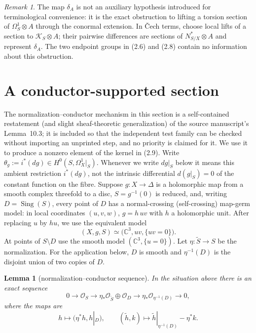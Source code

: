 \documentclass[11pt]{amsart}
\newcommand{\C}{\mathbb C}
\newcommand{\cO}{\mathcal O}
\newcommand{\Sing}{\operatorname{Sing}}
\theoremstyle{plain}
\newtheorem{lemma}[theorem]{Lemma}
\theoremstyle{definition}
\theoremstyle{remark}
\newtheorem{remark}[theorem]{Remark}
\begin{document}
\begin{remark}
The map $\delta_A$ is not an auxiliary hypothesis introduced for
terminological convenience: it is the exact obstruction to lifting a torsion
section of $\Omega^1_S\otimes A$ through the conormal extension.  In
\v{C}ech terms, choose local lifts of a section to
$\mathscr K_S\otimes A$; their pairwise differences are sections of
$N^*_{S/X}\otimes A$ and represent $\delta_A$.  The two endpoint groups in
(2.6) and (2.8) contain no information about this obstruction.
\end{remark}

\section{A conductor-supported section}

The normalization--conductor mechanism in this section is a self-contained
restatement (and slight sheaf-theoretic generalization) of the source
manuscript's Lemma~10.3; it is included so that the independent test family
can be checked without importing an unprinted step, and no priority is
claimed for it.  We use it to produce a nonzero element of the kernel in
(2.9).  Write
\(\theta_g:=i^*(dg)\in H^0(S,\Omega^1_X|_S)\).  Whenever we write
$dg|_S$ below it means this ambient restriction $i^*(dg)$, not the intrinsic
differential $d(g|_S)=0$ of the constant function on the fibre.  Suppose
$g:X\to\Delta$ is a holomorphic map from a smooth complex threefold to a
disc, $S=g^{-1}(0)$ is reduced, and, writing $D=\Sing(S)$, every point of
$D$ has a normal-crossing (self-crossing) map-germ model: in local coordinates
$(u,v,w)$, $g=h\,uv$ with $h$ a holomorphic unit.  After replacing $u$ by
$hu$, we use the equivalent model
\[
 (X,g,S)\simeq\bigl(\C^3,uv,\{uv=0\}\bigr).
 \tag{3.1}
\]
At points of $S\setminus D$ use the smooth model $(\C^3,\{u=0\})$.
Let $\eta:\widetilde S\to S$ be the normalization.
For the application below, $D$ is smooth and $\eta^{-1}(D)$ is the disjoint
union of two copies of $D$.

\begin{lemma}[normalization--conductor sequence]
\label{lem:conductor}
In the situation above there is an exact sequence
\[
0\longrightarrow\cO_S\longrightarrow
 \eta_*\cO_{\widetilde S}\oplus\cO_D
\longrightarrow\eta_*\cO_{\eta^{-1}(D)}\longrightarrow0,
\tag{3.2}
\]
where the maps are
\[
h\longmapsto(\eta^*h,h|_D),\qquad
(\widetilde h,k)\longmapsto\widetilde h|_{\eta^{-1}(D)}-\eta^*k.
\]
\end{lemma}
\end{document}
